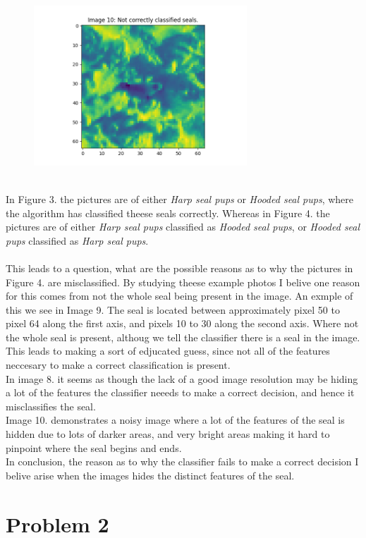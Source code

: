 \documentclass[12pt, letterpaper]{article}
\begin{document}
\begin{figure}[H]
        \includegraphics[width=8cm]{notcorr10}
      \end{figure}\\
      \noindent In Figure 3. the pictures are of either \textit{Harp seal pups} or \textit{Hooded seal pups}, where the algorithm has classified theese seals correctly. Whereas in Figure 4. the pictures are of either \textit{Harp seal pups} classified as \textit{Hooded seal pups}, or \textit{Hooded seal pups} classified as \textit{Harp seal pups}.\\
      \\
      This leads to a question, what are the possible reasons as to why the pictures in Figure 4. are misclassified. By studying theese example photos I belive one reason for this comes from not the whole seal being present in the image. An exmple of this we see in Image 9. The seal is located between approximately pixel 50 to pixel 64 along the first axis, and pixels 10 to 30 along the second axis. Where not the whole seal is present, althoug we tell the classifier there is a seal in the image. This leads to making a sort of edjucated guess, since not all of the features neccesary to make a correct classification is present.\\
      In image 8. it seems as though the lack of a good image resolution may be hiding a lot of the features the classifier neeeds to make a correct decision, and hence it misclassifies the seal.\\
      Image 10. demonstrates a noisy image where a lot of the features of the seal is hidden due to lots of darker areas, and very bright areas making it hard to pinpoint where the seal begins and ends.\\
      In conclusion, the reason as to why the classifier fails to make a correct decision I belive arise when the images hides the distinct features of the seal.
  \section*{Problem 2}
\end{document}

